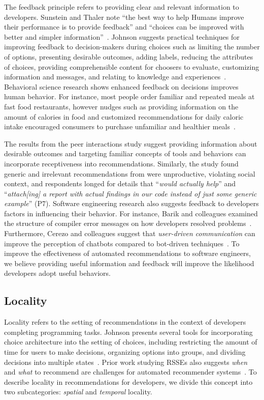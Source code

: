 The feedback principle refers to providing clear and relevant information to developers. Sunstein and Thaler note ``the best way to help Humans improve their performance is to provide feedback'' and ``choices can be improved with better and simpler information''~\citep[p.~92,~204]{nudge}. Johnson suggests practical techniques for improving feedback to decision-makers during choices such as limiting the number of options, presenting desirable outcomes, adding labels, reducing the attributes of choices, providing comprehensible content for choosers to evaluate, customizing information and messages, and relating to knowledge and experiences~\cite{johnson2012beyond}. Behavioral science research shows enhanced feedback on decisions improves human behavior. For instance, most people order familiar and repeated meals at fast food restaurants, however nudges such as providing information on the amount of calories in food and customized recommendations for daily caloric intake encouraged consumers to purchase unfamiliar and healthier meals~\cite{Wisdom2010Healthy}.

The results from the peer interactions study suggest providing information about desirable outcomes and targeting familiar concepts of tools and behaviors can incorporate receptiveness into recommendations. Similarly, the \tele study found generic and irrelevant recommendations from \toolone were unproductive, violating social context, and respondents longed for details that ``\textit{would actually help}'' and ``\textit{attach[ing] a report with actual findings in our code instead of just some generic example}'' (P7). Software engineering research also suggests feedback to developers factors in influencing their behavior. For instance, Barik and colleagues examined the structure of compiler error messages on how developers resolved problems~\cite{barik2018should}. Furthermore, Cerezo and colleagues suggest that \textit{user-driven communication} can improve the perception of chatbots compared to bot-driven techniques~\cite{cerezo2019building}. To improve the effectiveness of automated recommendations to software engineers, we believe providing useful information and feedback will improve the likelihood developers adopt useful behaviors.

\subsection{Locality} Locality refers to the setting of recommendations in the context of developers completing programming tasks. Johnson presents several tools for incorporating choice architecture into the setting of choices, including restricting the amount of time for users to make decisions, organizing options into groups, and dividing decisions into multiple states~\cite{johnson2012beyond}. Prior work studying RSSEs also suggests \textit{when} and \textit{what} to recommend are challenges for automated recommender systems~\cite{happel2008challenges}. To describe locality in recommendations for developers, we divide this concept into two subcategories: \textit{spatial} and \textit{temporal} locality.

